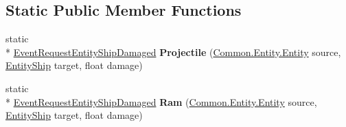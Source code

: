 \subsection*{Static Public Member Functions}
\begin{DoxyCompactItemize}
\item 
\hypertarget{class_skyrates_1_1_client_1_1_network_1_1_event_1_1_event_request_entity_ship_damaged_a2349e761091c78c246224a5b129cb69c}{static \\*
\hyperlink{class_skyrates_1_1_client_1_1_network_1_1_event_1_1_event_request_entity_ship_damaged}{Event\-Request\-Entity\-Ship\-Damaged} {\bfseries Projectile} (\hyperlink{class_skyrates_1_1_common_1_1_entity_1_1_entity}{Common.\-Entity.\-Entity} source, \hyperlink{class_skyrates_1_1_common_1_1_entity_1_1_entity_ship}{Entity\-Ship} target, float damage)}\label{class_skyrates_1_1_client_1_1_network_1_1_event_1_1_event_request_entity_ship_damaged_a2349e761091c78c246224a5b129cb69c}

\item 
\hypertarget{class_skyrates_1_1_client_1_1_network_1_1_event_1_1_event_request_entity_ship_damaged_abf0a860dbfeaf12e4f2165f4def0e438}{static \\*
\hyperlink{class_skyrates_1_1_client_1_1_network_1_1_event_1_1_event_request_entity_ship_damaged}{Event\-Request\-Entity\-Ship\-Damaged} {\bfseries Ram} (\hyperlink{class_skyrates_1_1_common_1_1_entity_1_1_entity}{Common.\-Entity.\-Entity} source, \hyperlink{class_skyrates_1_1_common_1_1_entity_1_1_entity_ship}{Entity\-Ship} target, float damage)}\label{class_skyrates_1_1_client_1_1_network_1_1_event_1_1_event_request_entity_ship_damaged_abf0a860dbfeaf12e4f2165f4def0e438}

\end{DoxyCompactItemize}
